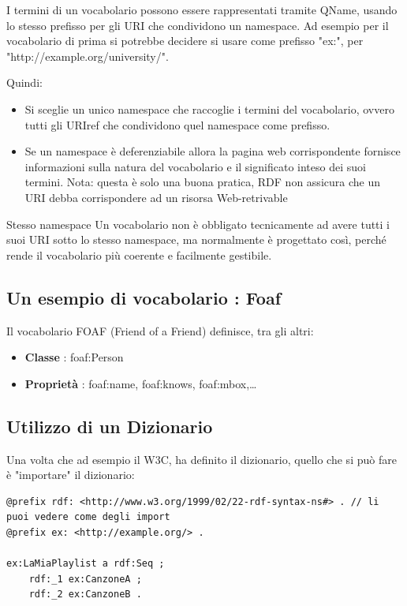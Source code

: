 I termini di un vocabolario possono essere rappresentati tramite QName, usando lo stesso prefisso per gli URI che condividono un namespace.
Ad esempio per il vocabolario di prima si potrebbe decidere si usare come prefisso "ex:", per "http://example.org/university/".


Quindi:
\begin{itemize}
    \item Si sceglie un unico namespace che raccoglie i termini del vocabolario, ovvero tutti gli URIref che condividono quel namespace come prefisso.
    \item  Se un namespace è deferenziabile allora la pagina web corrispondente fornisce informazioni
    sulla natura del vocabolario e il significato inteso dei suoi termini. Nota: questa è solo una buona
    pratica, RDF non assicura che un URI debba corrispondere ad un risorsa Web-retrivable
\end{itemize}

\begin{observation}{Stesso namespace}
   Un vocabolario non è obbligato tecnicamente ad avere tutti i suoi URI sotto lo stesso namespace, 
   ma normalmente è progettato così, perché rende il vocabolario più coerente e facilmente gestibile.
\end{observation}

\subsection{Un esempio di vocabolario : Foaf}
Il vocabolario FOAF (Friend of a Friend) definisce, tra gli altri:
\begin{itemize}
    \item \textbf{Classe} : foaf:Person
    \item \textbf{Proprietà} : foaf:name, foaf:knows, foaf:mbox,\dots
\end{itemize}
\subsection{Utilizzo di un Dizionario}
Una volta che ad esempio il W3C, ha definito il dizionario, quello che si può fare è "importare" il dizionario:
\begin{lstlisting}
@prefix rdf: <http://www.w3.org/1999/02/22-rdf-syntax-ns#> . // li puoi vedere come degli import
@prefix ex: <http://example.org/> .

ex:LaMiaPlaylist a rdf:Seq ;
    rdf:_1 ex:CanzoneA ;
    rdf:_2 ex:CanzoneB .
\end{lstlisting}

